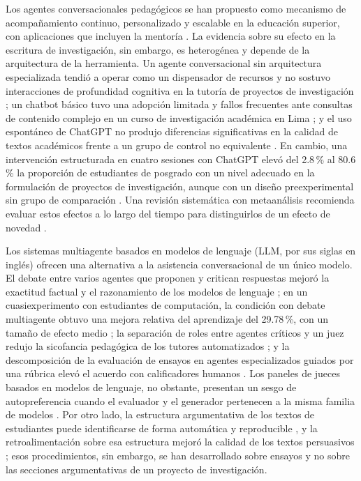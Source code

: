 \documentclass[journal]{IEEEtran}
\begin{document}
Los agentes conversacionales pedagógicos se han propuesto como mecanismo de acompañamiento continuo, personalizado y escalable en la educación superior, con aplicaciones que incluyen la mentoría \cite{yusuf2025}. La evidencia sobre su efecto en la escritura de investigación, sin embargo, es heterogénea y depende de la arquitectura de la herramienta. Un agente conversacional sin arquitectura especializada tendió a operar como un dispensador de recursos y no sostuvo interacciones de profundidad cognitiva en la tutoría de proyectos de investigación \cite{ortega2021}; un chatbot básico tuvo una adopción limitada y fallos frecuentes ante consultas de contenido complejo en un curso de investigación académica en Lima \cite{arredondo2020}; y el uso espontáneo de ChatGPT no produjo diferencias significativas en la calidad de textos académicos frente a un grupo de control no equivalente \cite{apolin2024}. En cambio, una intervención estructurada en cuatro sesiones con ChatGPT elevó del 2.8\,\% al 80.6\,\% la proporción de estudiantes de posgrado con un nivel adecuado en la formulación de proyectos de investigación, aunque con un diseño preexperimental sin grupo de comparación \cite{hinojosa2024}. Una revisión sistemática con metaanálisis recomienda evaluar estos efectos a lo largo del tiempo para distinguirlos de un efecto de novedad \cite{deng2025}.

Los sistemas multiagente basados en modelos de lenguaje (LLM, por sus siglas en inglés) ofrecen una alternativa a la asistencia conversacional de un único modelo. El debate entre varios agentes que proponen y critican respuestas mejoró la exactitud factual y el razonamiento de los modelos de lenguaje \cite{duy2024}; en un cuasiexperimento con estudiantes de computación, la condición con debate multiagente obtuvo una mejora relativa del aprendizaje del 29.78\,\%, con un tamaño de efecto medio \cite{duj2025}; la separación de roles entre agentes críticos y un juez redujo la sicofancia pedagógica de los tutores automatizados \cite{sadhu2025}; y la descomposición de la evaluación de ensayos en agentes especializados guiados por una rúbrica elevó el acuerdo con calificadores humanos \cite{jordan2025}. Los paneles de jueces basados en modelos de lenguaje, no obstante, presentan un sesgo de autopreferencia cuando el evaluador y el generador pertenecen a la misma familia de modelos \cite{panickssery2024}. Por otro lado, la estructura argumentativa de los textos de estudiantes puede identificarse de forma automática y reproducible \cite{stab2017}, y la retroalimentación sobre esa estructura mejoró la calidad de los textos persuasivos \cite{wambsganss2020}; esos procedimientos, sin embargo, se han desarrollado sobre ensayos y no sobre las secciones argumentativas de un proyecto de investigación.
\end{document}
